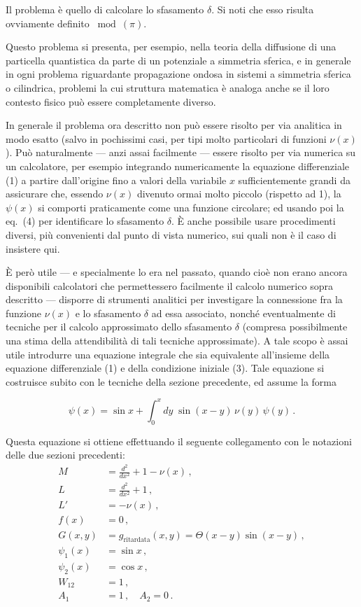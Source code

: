\documentclass[11pt, a4paper]{book}
\numberwithin{equation}{section}
\begin{document}
Il problema è quello di calcolare lo sfasamento $\delta$. Si noti che esso risulta ovviamente definito $\bmod(\pi)$.

Questo problema si presenta, per esempio, nella teoria della diffusione di una particella quantistica da parte di un potenziale a simmetria sferica, e in generale in ogni problema riguardante propagazione ondosa in sistemi a simmetria sferica o cilindrica, problemi la cui struttura matematica è analoga anche se il loro contesto fisico può essere completamente diverso.

In generale il problema ora descritto non può essere risolto per via analitica in modo esatto (salvo in pochissimi casi, per tipi molto particolari di funzioni $\nu(x)$). Può naturalmente --- anzi assai facilmente --- essere risolto per via numerica su un calcolatore, per esempio integrando numericamente la equazione differenziale (1) a partire dall'origine fino a valori della variabile $x$ sufficientemente grandi da assicurare che, essendo $\nu(x)$ divenuto ormai molto piccolo (rispetto ad 1), la $\psi(x)$ si comporti praticamente come una funzione circolare; ed usando poi la eq.\ (4) per identificare lo sfasamento $\delta$. È anche possibile usare procedimenti diversi, più convenienti dal punto di vista numerico, sui quali non è il caso di insistere qui.

È però utile --- e specialmente lo era nel passato, quando cioè non erano ancora disponibili calcolatori che permettessero facilmente il calcolo numerico sopra descritto --- disporre di strumenti analitici per investigare la connessione fra la funzione $\nu(x)$ e lo sfasamento $\delta$ ad essa associato, nonché eventualmente di tecniche per il calcolo approssimato dello sfasamento $\delta$ (compresa possibilmente una stima della attendibilità di tali tecniche approssimate). A tale scopo è assai utile introdurre una equazione integrale che sia equivalente all'insieme della equazione differenziale (1) e della condizione iniziale (3). Tale equazione si costruisce subito con le tecniche della sezione precedente, ed assume la forma


\begin{equation}
\psi(x) = \sin x + \int_0^x dy\;\sin(x-y)\,\nu(y)\,\psi(y)\,. \tag{5}
\end{equation}

Questa equazione si ottiene effettuando il seguente collegamento con le notazioni delle due sezioni precedenti:
\begin{align*}
M &= \frac{d^2}{dx^2} + 1 - \nu(x)\,, \\
L &= \frac{d^2}{dx^2} + 1\,, \\
L' &= -\nu(x)\,, %
\\
f(x) &= 0\,, \\
G(x,y) &= g_{\text{ritardata}}(x,y) = \Theta(x-y)\sin(x-y)\,, \\
\psi_1(x) &= \sin x\,, \\
\psi_2(x) &= \cos x\,, \\
W_{12} &= 1\,, \\
A_1 &= 1\,, \quad A_2 = 0\,.
\end{align*}
\end{document}
